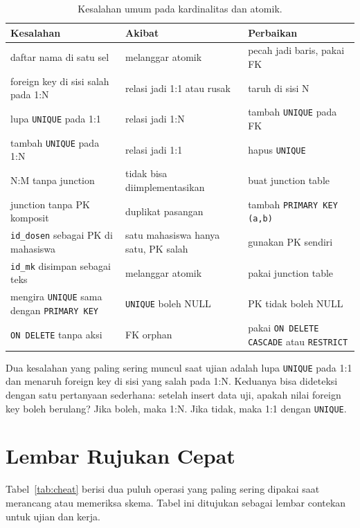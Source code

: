 \documentclass[11pt,a4paper]{article}
\begin{document}
\begin{table}[H]
	\centering
	\caption{Kesalahan umum pada kardinalitas dan atomik.}
	\label{tab:mistakes}
	\scriptsize
	\setlength{\tabcolsep}{3pt}
	\renewcommand{\arraystretch}{1.2}
	\begin{tabularx}{\textwidth}{>{\raggedright\arraybackslash}p{4.5cm} >{\raggedright\arraybackslash}X >{\raggedright\arraybackslash}X}
		\toprule
		Kesalahan & Akibat & Perbaikan \\
		\midrule
		daftar nama di satu sel & melanggar atomik & pecah jadi baris, pakai FK \\
		foreign key di sisi salah pada 1:N & relasi jadi 1:1 atau rusak & taruh di sisi N \\
		lupa \texttt{UNIQUE} pada 1:1 & relasi jadi 1:N & tambah \texttt{UNIQUE} pada FK \\
		tambah \texttt{UNIQUE} pada 1:N & relasi jadi 1:1 & hapus \texttt{UNIQUE} \\
		N:M tanpa junction & tidak bisa diimplementasikan & buat junction table \\
		junction tanpa PK komposit & duplikat pasangan & tambah \texttt{PRIMARY KEY (a,b)} \\
		\texttt{id\_dosen} sebagai PK di mahasiswa & satu mahasiswa hanya satu, PK salah & gunakan PK sendiri \\
		\texttt{id\_mk} disimpan sebagai teks & melanggar atomik & pakai junction table \\
		mengira \texttt{UNIQUE} sama dengan \texttt{PRIMARY KEY} & \texttt{UNIQUE} boleh NULL & PK tidak boleh NULL \\
		\texttt{ON DELETE} tanpa aksi & FK orphan & pakai \texttt{ON DELETE CASCADE} atau \texttt{RESTRICT} \\
		\bottomrule
	\end{tabularx}
\end{table}

Dua kesalahan yang paling sering muncul saat ujian adalah lupa \texttt{UNIQUE} pada 1:1 dan menaruh foreign key di sisi yang salah pada 1:N. Keduanya bisa dideteksi dengan satu pertanyaan sederhana: setelah insert data uji, apakah nilai foreign key boleh berulang? Jika boleh, maka 1:N. Jika tidak, maka 1:1 dengan \texttt{UNIQUE}.

\section{Lembar Rujukan Cepat}

Tabel~\ref{tab:cheat} berisi dua puluh operasi yang paling sering dipakai saat merancang atau memeriksa skema. Tabel ini ditujukan sebagai lembar contekan untuk ujian dan kerja.
\end{document}
